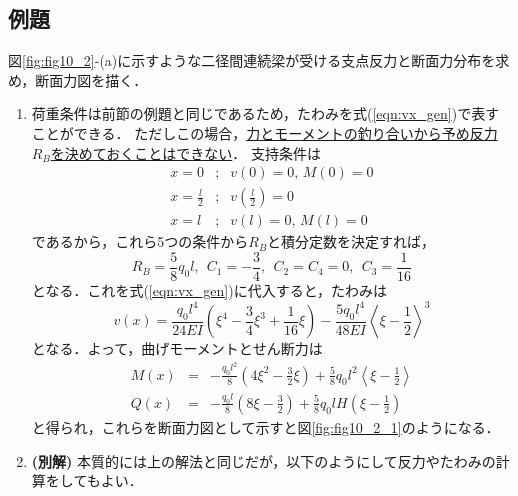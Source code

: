 \documentclass[10pt,a4j]{jbook}
\begin{document}
\subsection{例題}
図\ref{fig:fig10_2}-(a)に示すような二径間連続梁が受ける支点反力と断面力分布を求め，断面力図を描く．
\begin{enumerate}
\item
荷重条件は前節の例題と同じであるため，たわみを式(\ref{eqn:vx_gen})で表すことができる．
ただしこの場合，\underline{力とモーメントの釣り合いから予め反力$R_B$を決めておくことはできない}．
支持条件は
\begin{eqnarray}
	x=0 &;& v(0)=0, \, M(0)=0 
	\label{eqn:BC_0}
	\\
	x=\frac{l}{2} &;& v\left( \frac{l}{2} \right)=0
	\label{eqn:BC_l2}
	\\
	x=l &;& v(l)=0, \, M(l)=0
	\label{eqn:BC_l}
\end{eqnarray}
であるから，これら5つの条件から$R_B$と積分定数を決定すれば，
\begin{equation}
	R_B=\frac{5}{8}q_0l, \ \ C_1=-\frac{3}{4}, \ \ C_2=C_4=0, \ \ C_3=\frac{1}{16}
\end{equation}
となる．これを式(\ref{eqn:vx_gen})に代入すると，たわみは
\begin{equation}
	v(x)=\frac{q_0l^4}{24EI}\left( \xi^4-\frac{3}{4}\xi^3 +\frac{1}{16}\xi \right)
	-
	\frac{5q_0l^4}{48EI}\left< \xi-\frac{1}{2}\right>^3
\end{equation}
となる．よって，曲げモーメントとせん断力は
\begin{eqnarray}
	M(x) &= & 
		-\frac{q_0l^2}{8}\left(4\xi^2 -\frac{3}{2}\xi \right)
		+
		\frac{5}{8}q_0l^2\left< \xi-\frac{1}{2}\right>
	\\
	Q(x) &= & 
		-\frac{q_0l}{8}\left(8\xi -\frac{3}{2} \right)
		+
		\frac{5}{8}q_0lH\left( \xi-\frac{1}{2}\right)
\end{eqnarray}
と得られ，これらを断面力図として示すと図\ref{fig:fig10_2_1}のようになる．
\item
{\bf (別解)}
本質的には上の解法と同じだが，以下のようにして反力やたわみの計算をしてもよい．


\end{enumerate}
\end{document}
